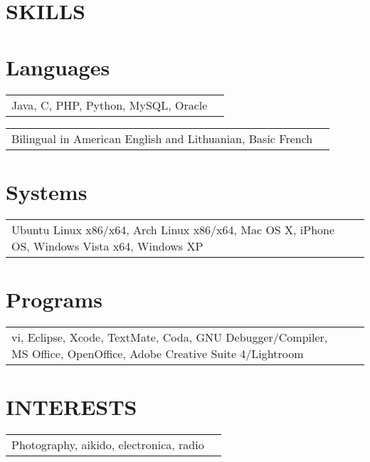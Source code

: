 \documentclass[margin, line]{res}
\begin{document}
\begin{resume}
\section{SKILLS} 
\normalsize{\section{Languages}}
	\begin{tabular} {p{6in} r}
		Java, C, PHP, Python, MySQL, Oracle
		\end{tabular}
	\begin{tabular} {p{5in} r}
		Bilingual in American English and Lithuanian, Basic French
		\end{tabular}
\normalsize{\section{Systems}} 
	\begin{tabular} {p{5in} r}
		Ubuntu Linux x86/x64, Arch Linux x86/x64, Mac OS X, iPhone OS, Windows Vista x64, Windows XP
	\end{tabular}
\normalsize{\section{Programs}}
	\begin{tabular} {p{5in} r}
		vi, Eclipse, Xcode, TextMate, Coda, GNU Debugger/Compiler, MS Office, OpenOffice, Adobe Creative Suite 4/Lightroom
		\end{tabular}

\section{INTERESTS}
	\begin{tabular} {p{6in} r}
	Photography, aikido, electronica, radio
 	\end{tabular}
\end{resume} 
\end{document}
